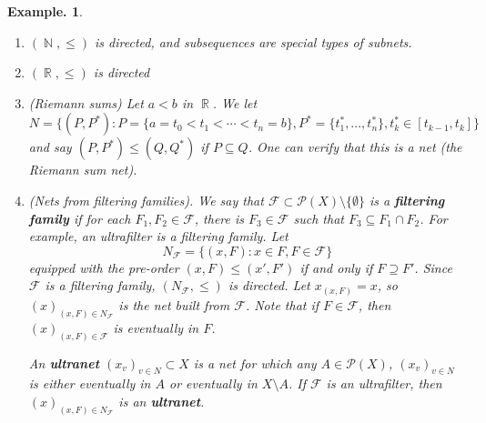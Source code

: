\documentclass[11pt, a4paper]{memoir}
\DeclareMathOperator{\N}{{\mathbb{N}}}
\DeclareMathOperator{\R}{{\mathbb{R}}}
\theoremstyle{change}
\theoremstyle{plain}
\theoremstyle{nonumberplain}
\newtheorem{example}{Example.}
\numberwithin{equation}{section}
\begin{document}
\begin{example}
    \begin{enumerate}[nl,r]
        \item $(\N,\leq)$ is directed, and subsequences are special types of subnets.
        \item $(\R,\leq)$ is directed
        \item (\textit{Riemann sums}) Let $a<b$ in $\R$.
            We let
            \begin{equation*}
                N=\{(P,P^*):P=\{a=t_0<t_1<\cdots<t_n=b\},P^*=\{t_1^*,\ldots,t_n^*\},t_k^*\in[t_{k-1},t_k]\}
            \end{equation*}
            and say $(P,P^*)\leq (Q,Q^*)$ if $P\subseteq Q$.
            One can verify that this is a net (the Riemann sum net).
        \item (\textit{Nets from filtering families}).
            We say that $\mathcal{F}\subset\mathcal{P}(X)\setminus\{\emptyset\}$ is a \textbf{filtering family} if for each $F_1,F_2\in\mathcal{F}$, there is $F_3\in\mathcal{F}$ such that $F_3\subseteq F_1\cap F_2$.
            For example, an ultrafilter is a filtering family.
            Let
            \begin{equation*}
                N_{\mathcal{F}}=\{(x,F):x\in F,F\in\mathcal{F}\}
            \end{equation*}
            equipped with the pre-order $(x,F)\leq(x',F')$ if and only if $F\supseteq F'$.
            Since $\mathcal{F}$ is a filtering family, $(N_{\mathcal{F}},\leq)$ is directed.
            Let $x_{(x,F)}=x$, so $(x)_{(x,F)\in N_{\mathcal{F}}}$ is the net built from $\mathcal{F}$.
            Note that if $F\in\mathcal{F}$, then $(x)_{(x,F)\in\mathcal{F}}$ is eventually in $F$.

            An \textbf{ultranet} $(x_v)_{v\in N}\subset X$ is a net for which any $A\in\mathcal{P}(X)$, $(x_v)_{v\in N}$ is either eventually in $A$ or eventually in $X\setminus A$.
            If $\mathcal{F}$ is an ultrafilter, then $(x)_{(x,F)\in N_{\mathcal{F}}}$ is an \textbf{ultranet}.
    \end{enumerate}
\end{example}
\end{document}
